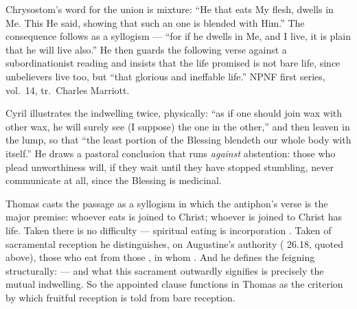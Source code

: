 \begin{witnessnote}
Chrysostom's word for the union is mixture: ``He that eats My flesh, dwells in
Me. This He said, showing that such an one is blended with Him.'' The
consequence follows as a syllogism --- ``for if he dwells in Me, and I live, it
is plain that he will live also.'' He then guards the following verse against
a subordinationist reading and insists that the life promised is not bare life,
since unbelievers live too, but ``that glorious and ineffable life.'' NPNF
first series, vol.~14, tr.\ Charles Marriott.
\end{witnessnote}

\begin{witnessnote}
Cyril illustrates the indwelling twice, physically: ``as if one should join wax
with other wax, he will surely see (I suppose) the one in the other,'' and
then leaven in the lump, so that ``the least portion of the Blessing blendeth
our whole body with itself.'' He draws a pastoral conclusion that runs
\textit{against} abstention: those who plead unworthiness will, if they wait
until they have stopped stumbling, never communicate at all, since the
Blessing is medicinal.
\end{witnessnote}

\begin{witnessnote}
Thomas casts the passage as a syllogism in which the antiphon's verse is the
major premise: whoever eats is joined to Christ; whoever is joined to Christ
has life. Taken  there is no difficulty --- spiritual eating is
incorporation . Taken of sacramental
reception he distinguishes, on Augustine's authority (
26.18, quoted above), those who eat  from those , in whom
. And he defines the
feigning structurally:  --- and what this sacrament outwardly signifies is precisely
the mutual indwelling. So the appointed clause functions in Thomas as the
criterion by which fruitful reception is told from bare reception.
\end{witnessnote}

